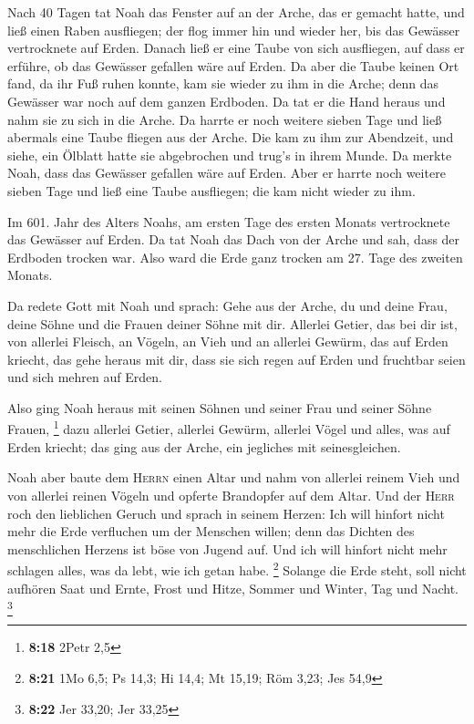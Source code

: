  Nach 40 Tagen tat Noah das Fenster auf an der Arche, das
er gemacht hatte,  und ließ einen Raben ausfliegen; der
flog immer hin und wieder her, bis das Gewässer vertrocknete auf Erden.
 Danach ließ er eine Taube von sich ausfliegen, auf dass
er erführe, ob das Gewässer gefallen wäre auf Erden.  Da
aber die Taube keinen Ort fand, da ihr Fuß ruhen konnte, kam sie wieder
zu ihm in die Arche; denn das Gewässer war noch auf dem ganzen Erdboden.
Da tat er die Hand heraus und nahm sie zu sich in die Arche.
 Da harrte er noch weitere sieben Tage und ließ abermals
eine Taube fliegen aus der Arche.  Die kam zu ihm zur
Abendzeit, und siehe, ein Ölblatt hatte sie abgebrochen und trug's in
ihrem Munde. Da merkte Noah, dass das Gewässer gefallen wäre auf Erden.
 Aber er harrte noch weitere sieben Tage und ließ eine
Taube ausfliegen; die kam nicht wieder zu ihm.

 Im 601. Jahr des Alters Noahs, am ersten Tage des ersten
Monats vertrocknete das Gewässer auf Erden. Da tat Noah das Dach von der
Arche und sah, dass der Erdboden trocken war.  Also ward
die Erde ganz trocken am 27. Tage des zweiten Monats.

 Da redete Gott mit Noah und sprach:  Gehe
aus der Arche, du und deine Frau, deine Söhne und die Frauen deiner
Söhne mit dir.  Allerlei Getier, das bei dir ist, von
allerlei Fleisch, an Vögeln, an Vieh und an allerlei Gewürm, das auf
Erden kriecht, das gehe heraus mit dir, dass sie sich regen auf Erden
und fruchtbar seien und sich mehren auf Erden.

 Also ging Noah heraus mit seinen Söhnen und seiner Frau
und seiner Söhne Frauen, \footnote{\textbf{8:18} 2Petr 2,5}
 dazu allerlei Getier, allerlei Gewürm, allerlei Vögel
und alles, was auf Erden kriecht; das ging aus der Arche, ein jegliches
mit seinesgleichen.

 Noah aber baute dem \textsc{Herrn} einen Altar und nahm
von allerlei reinem Vieh und von allerlei reinen Vögeln und opferte
Brandopfer auf dem Altar.  Und der \textsc{Herr} roch den
lieblichen Geruch und sprach in seinem Herzen: Ich will hinfort nicht
mehr die Erde verfluchen um der Menschen willen; denn das Dichten des
menschlichen Herzens ist böse von Jugend auf. Und ich will hinfort nicht
mehr schlagen alles, was da lebt, wie ich getan habe. \footnote{\textbf{8:21}
  1Mo 6,5; Ps 14,3; Hi 14,4; Mt 15,19; Röm 3,23; Jes 54,9}
 Solange die Erde steht, soll nicht aufhören Saat und
Ernte, Frost und Hitze, Sommer und Winter, Tag und Nacht. \footnote{\textbf{8:22}
  Jer 33,20; Jer 33,25}

